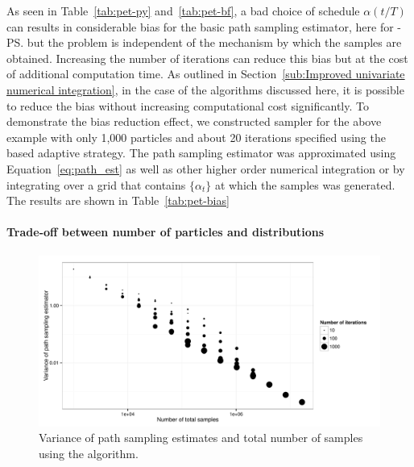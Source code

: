 As seen in Table~\ref{tab:pet-py} and~\ref{tab:pet-bf}, a bad choice of
schedule $\alpha(t/T)$ can results in considerable bias for the basic path
sampling estimator, here for \smc[2]-\ps but the problem is independent of the
mechanism by which the samples are obtained. Increasing the number of
iterations can reduce this bias but at the cost of additional computation
time. As outlined in Section~\ref{sub:Improved univariate numerical
  integration}, in the case of the \smc algorithms discussed here, it is
possible to reduce the bias without increasing computational cost
significantly. To demonstrate the bias reduction effect, we constructed \smc
sampler for the above \pet example with only 1,000 particles and about 20
iterations specified using the \cess based adaptive strategy. The path
sampling estimator was approximated using Equation~\eqref{eq:path_est} as well
as other higher order numerical integration or by integrating over a grid that
contains $\{\alpha_t\}$ at which the samples was generated. The results are
shown in Table~\ref{tab:pet-bias}

\paragraph{Trade-off between number of particles and distributions}

\begin{figure}[t]
  \includegraphics[width=\linewidth]{fig/Particle_Iter_Var}
  \caption{Variance of path sampling estimates and total number of samples
    using the \smc[2] algorithm.}
  \label{fig:particle iter num}
\end{figure}


